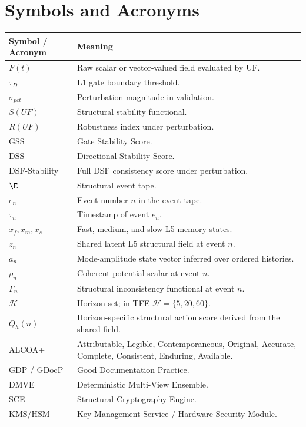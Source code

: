\section{Symbols and Acronyms}
\begin{longtable}{p{}p{}}
\toprule
Symbol / Acronym & Meaning \\
\midrule
$F(t)$ & Raw scalar or vector-valued field evaluated by UF. \\
$\tau_D$ & L1 gate boundary threshold. \\
$\sigma_{pct}$ & Perturbation magnitude in validation. \\
$S(UF)$ & Structural stability functional. \\
$R(UF)$ & Robustness index under perturbation. \\
GSS & Gate Stability Score. \\
DSS & Directional Stability Score. \\
DSF-Stability & Full DSF consistency score under perturbation. \\
$\E$ & Structural event tape. \\
$e_n$ & Event number $n$ in the event tape. \\
$\tau_n$ & Timestamp of event $e_n$. \\
$x_f,x_m,x_s$ & Fast, medium, and slow L5 memory states. \\
$z_n$ & Shared latent L5 structural field at event $n$. \\
$a_n$ & Mode-amplitude state vector inferred over ordered histories. \\
$\rho_n$ & Coherent-potential scalar at event $n$. \\
$\Gamma_n$ & Structural inconsistency functional at event $n$. \\
$\mathcal{H}$ & Horizon set; in TFE $\mathcal{H}=\{5,20,60\}$. \\
$Q_h(n)$ & Horizon-specific structural action score derived from the shared field. \\
ALCOA+ & Attributable, Legible, Contemporaneous, Original, Accurate, Complete, Consistent, Enduring, Available. \\
GDP / GDocP & Good Documentation Practice. \\
DMVE & Deterministic Multi-View Ensemble. \\
SCE & Structural Cryptography Engine. \\
KMS/HSM & Key Management Service / Hardware Security Module. \\
\bottomrule
\end{longtable}
